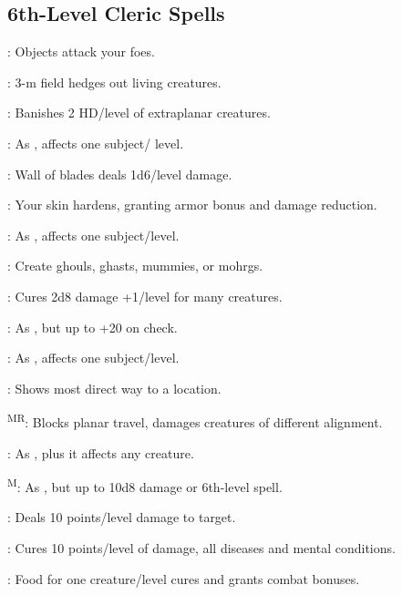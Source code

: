 


\subsection{6th-Level Cleric Spells}

: Objects attack your foes.

: 3-m field hedges out living creatures.

: Banishes 2 HD/level of extraplanar creatures.

: As , affects one subject/ level.

: Wall of blades deals 1d6/level damage.

: Your skin hardens, granting armor bonus and damage reduction. %

: As , affects one subject/level.

: Create ghouls, ghasts, mummies, or mohrgs.

: Cures 2d8 damage +1/level for many creatures.

: As , but up to +20 on check.

: As , affects one subject/level.

: Shows most direct way to a location.

\textsuperscript{MR}: Blocks planar travel, damages creatures of different alignment.

: As , plus it affects any creature.

\textsuperscript{M}: As , but up to 10d8 damage or 6th-level spell.

: Deals 10 points/level damage to target.

: Cures 10 points/level of damage, all diseases and mental conditions.

: Food for one creature/level cures and grants combat bonuses.

